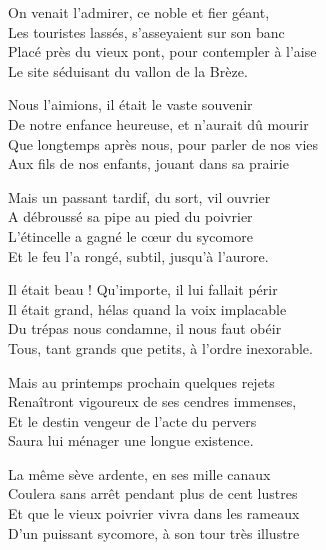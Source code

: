 
\begin{center}
\begin{minipage}{0.55\textwidth}

On venait l’admirer, ce noble et fier géant,\\
Les touristes lassés, s’asseyaient sur son banc\\
Placé près du vieux pont, pour contempler à l’aise\\
Le site séduisant du vallon de la Brèze.

\vspace{0.35cm}

Nous l’aimions, il était le vaste souvenir\\
De notre enfance heureuse, et n’aurait dû mourir\\
Que longtemps après nous, pour parler de nos vies\\
Aux fils de nos enfants, jouant dans sa prairie

\vspace{0.35cm}

Mais un passant tardif, du sort, vil ouvrier\\
A débroussé sa pipe au pied du poivrier\\
L’étincelle a gagné le cœur du sycomore\\
Et le feu l’a rongé, subtil, jusqu’à l’aurore.

\vspace{0.35cm}

Il était beau ! Qu’importe, il lui fallait périr\\
Il était grand, hélas quand la voix implacable\\
Du trépas nous condamne, il nous faut obéir\\
Tous, tant grands que petits, à l’ordre inexorable.

\vspace{0.35cm}

Mais au printemps prochain quelques rejets\\
Renaîtront vigoureux de ses cendres immenses,\\
Et le destin vengeur de l’acte du pervers\\
Saura lui ménager une longue existence.

\vspace{0.35cm}

La même sève ardente, en ses mille canaux\\
Coulera sans arrêt pendant plus de cent lustres\\
Et que le vieux poivrier vivra dans les rameaux\\
D’un puissant sycomore, à son tour très illustre


\end{minipage}
\end{center}
